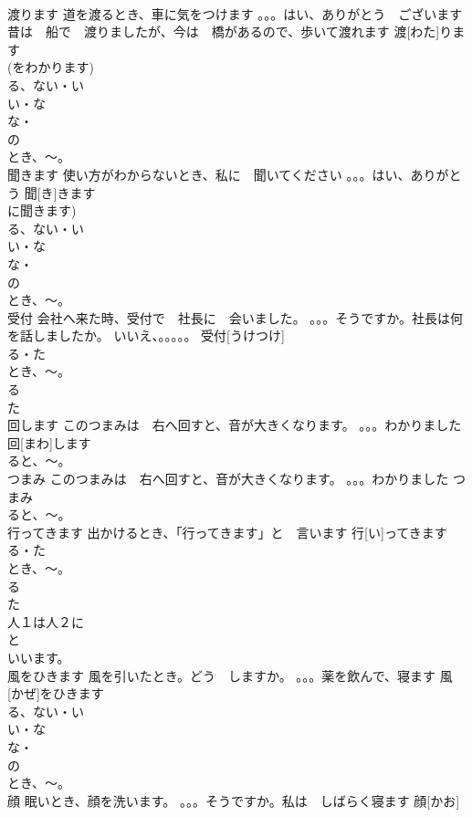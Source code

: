 \documentclass[8pt]{extreport}
\begin{document}
\begin{CJK}{UTF8}{min}
\\	渡ります	道を渡るとき、車に気をつけます 。。。はい、ありがとう　ございます 昔は　船で　渡りましたが、今は　橋があるので、歩いて渡れます	渡[わた]ります			
\\	(をわかります)	
\\	る、ない・い
\\	い・な
\\	な・
\\	の
\\	とき、～。
\\	聞きます	使い方がわからないとき、私に　聞いてください 。。。はい、ありがとう	聞[き]きます			
\\	に聞きます)	
\\	る、ない・い
\\	い・な
\\	な・
\\	の
\\	とき、～。
\\	受付	会社へ来た時、受付で　社長に　会いました。 。。。そうですか。社長は何を話しましたか。 いいえ、。。。。。	受付[うけつけ]			
\\	る・た
\\	とき、～。
\\	る 
\\	た
\\	回します	このつまみは　右へ回すと、音が大きくなります。 。。。わかりました	回[まわ]します			
\\	ると、～。
\\	つまみ	このつまみは　右へ回すと、音が大きくなります。 。。。わかりました	つまみ			
\\	ると、～。
\\	行ってきます	出かけるとき、「行ってきます」と　言います	行[い]ってきます			
\\	る・た
\\	とき、～。
\\	る 
\\	た
\\	人１は人２に
\\	と　
\\	いいます。
\\	風をひきます	風を引いたとき。どう　しますか。 。。。薬を飲んで、寝ます	風[かぜ]をひきます			
\\	る、ない・い
\\	い・な
\\	な・
\\	の
\\	とき、～。
\\	顔	眠いとき、顔を洗います。 。。。そうですか。私は　しばらく寝ます	顔[かお]			

\end{CJK}
\end{document}

